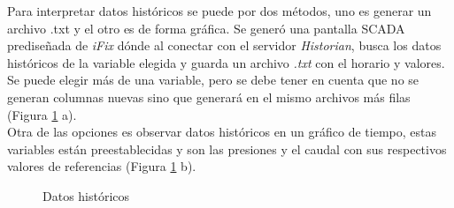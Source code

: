 Para interpretar datos históricos se puede por dos métodos, uno es generar un archivo .txt y el otro es de forma gráfica. 
Se generó una pantalla SCADA prediseñada de \textit{iFix} dónde al conectar con el servidor \textit{Historian}, busca los datos históricos de la variable elegida y guarda un archivo \textit{.txt} con el horario y valores. Se puede elegir más de una variable, pero se debe tener en cuenta que no se generan columnas nuevas sino que generará en el mismo archivos más filas (Figura \ref{fig:grafhist} a).\\
Otra de las opciones es observar datos históricos en un gráfico de tiempo, estas variables están preestablecidas y son las presiones y el caudal con sus respectivos valores de referencias (Figura \ref{fig:grafhist} b).


\begin{figure}[htbp]
	\centering
	\caption{Datos históricos} \label{fig:grafhist}
\end{figure}





\newpage